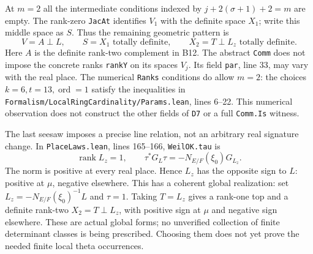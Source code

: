 At $m=2$ all the intermediate conditions indexed by $j+2(\sigma+1)+2=m$ are empty. The rank-zero \texttt{JacAt} identifies $V_1$ with the definite space $X_1$; write this middle space as $S$. Thus the remaining geometric pattern is
\[
 V=A\perp L,\qquad S=X_1\text{ totally definite},\qquad
 X_2=T\perp L_z\text{ totally definite}.
 \tag{B15a}
\]
Here $A$ is the definite rank-two complement in B12. The abstract \texttt{Comm} does not impose the concrete ranks \texttt{rankY} on its spaces $V_j$. Its field \texttt{par}, line 33, may vary with the real place. The numerical \texttt{Ranks} conditions do allow $m=2$: the choices $k=6,t=13,\operatorname{ord}=1$ satisfy the inequalities in \texttt{Formalism/\allowbreak{}LocalRingCardinality/\allowbreak{}Params.lean}, lines 6--22. This numerical observation does not construct the other fields of \texttt{D7} or a full \texttt{Comm.Is} witness.

The last seesaw imposes a precise line relation, not an arbitrary real signature change. In \texttt{PlaceLaws.lean}, lines 165--166, \texttt{WeilOK.tau} is
\[
 \operatorname{rank}L_z=1,\qquad
 \tau^*G_L\tau=-N_{E/F}(\xi_0)G_{L_z}.
 \tag{B15b}
\]
The norm is positive at every real place. Hence $L_z$ has the opposite sign to $L$: positive at $\mu$, negative elsewhere. This has a coherent global realization: set $L_z=-N_{E/F}(\xi_0)^{-1}L$ and $\tau=1$. Taking $T=L_z$ gives a rank-one top and a definite rank-two $X_2=T\perp L_z$, with positive sign at $\mu$ and negative sign elsewhere. These are actual global forms; no unverified collection of finite determinant classes is being prescribed. Choosing them does not yet prove the needed finite local theta occurrences.

